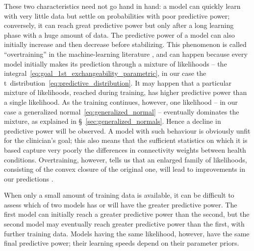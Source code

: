\documentclass[%
]{frontiersSCNS-nologo} %
\newcommand*{\sect}{\S} %
\renewcommand*{\|}{\mathpunct{|}}%
\begin{document}
These two characteristics need not go hand in hand: a model can quickly
learn with very little data but settle on probabilities with poor
predictive power; conversely, it can reach great predictive power but only
after a long learning phase with a huge amount of data. The predictive
power of a model can also initially increase and then decrease before
stabilizing. This phenomenon is called \enquote{overtraining} in the
machine-learning literature \citetext{\citealp{chauvin1990,chauvin1991};
  \citealp[\sect~6.7]{mackay1992};
  \citealp{sjoebergetal1992,sjoebergetal1995}}, and can happen because
every model initially makes its prediction through a mixture of likelihoods
-- the integral~\eqref{eq:goal_1st_exchangeability_parametric}, in our case
the t~distribution~\eqref{eq:predictive_distribution}. It may happen that a
particular mixture of likelihoods, reached during training, has higher
predictive power than a single likelihood. As the training continues,
however, one likelihood -- in our case a generalized
normal~\eqref{eq:generalized_normal} -- eventually dominates the mixture,
as explained in \sect~\ref{sec:generalized_normals}. Hence a decline in
predictive power will be observed. A model with such behaviour is obviously
unfit for the clinician's goal; this also means that the sufficient
statistics on which it is based capture very poorly the differences in
connectivity weights between health conditions. Overtraining, however,
tells us that an enlarged family of likelihoods, consisting of the convex
closure of the original one, will lead to improvements in our predictions
\citep{portamana2018b}.




When only a small amount of training data is available, it can be difficult
to assess which of two models has or will have the greater predictive
power. The first model can initially reach a greater predictive power than
the second, but the second model may eventually reach greater predictive
power than the first, with further training data. Models having the same
likelihood, however, have the same final predictive power; their learning
speeds depend on their parameter priors.
\end{document}
